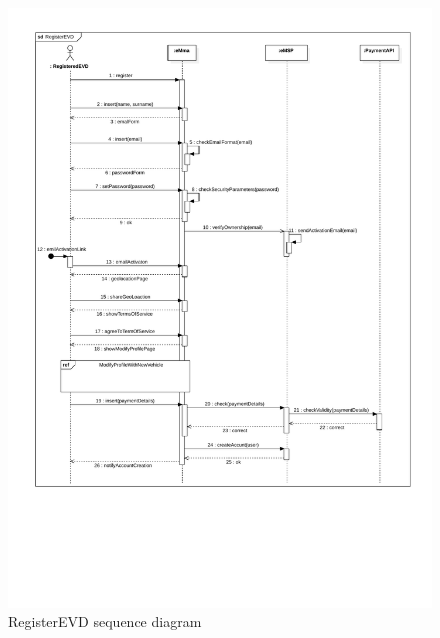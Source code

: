 \begin{figure}[H]
    \centering
    \includegraphics[width=\textwidth, trim={0 6cm 0 0}, clip]{Images/cp3/seqDiagrams/RegisterEVD.pdf}
    \caption{RegisterEVD sequence diagram}
\end{figure}

